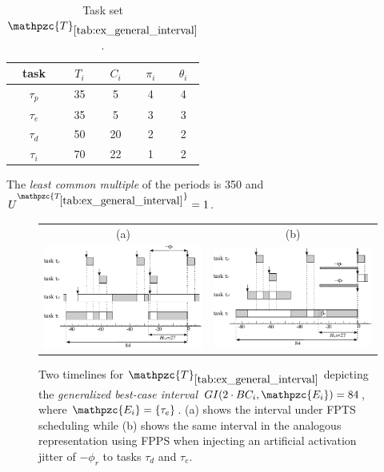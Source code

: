 \documentclass[fleqn]{article}
\begin{document}
\begin{table}
	\center
	\caption{Task set $\mathpzc{T}_{\ref{tab:ex_general_interval}}$.}
	\label{tab:ex_general_interval}
	\begin{tabular}{c c c c c}
		\hline 
		task & $T_i$ & $C_i$ & $\pi_i$ & $\theta_i$ \\ 
		\hline 
		$\tau_p$& 35 & 5  & 4 & 4 \\
		$\tau_e$& 35 & 5  & 3 & 3 \\ 
		$\tau_d$& 50 & 20 & 2 & 2 \\ 
		$\tau_i$& 70 & 22 & 1 & 2 \\
		\hline 
	\end{tabular}
	\small
	\item The \textit{least common multiple} of the periods is 350 and $U^{\mathpzc{T_{\ref{tab:ex_general_interval}}}}=1$.
\end{table}

\begin{figure}
	\centering
	\begin{tabular}{cc}
		(a) & (b) \\
	\includegraphics[width=0.5\linewidth]{figures/ex_general_interval1} &
	\includegraphics[width=0.5\linewidth]{figures/ex_general_interval2}
	\end{tabular}
	
	\caption{Two timelines for $\mathpzc{T}_{\ref{tab:ex_general_interval}}$ depicting the \textit{generalized best-case interval} $GI(2 \cdot BC_i,\mathpzc{E_i}) = 84$, where $\mathpzc{E_i} = \{\tau_e\}$. (a) shows the interval under FPTS scheduling while (b) shows the same interval in the analogous representation using FPPS when injecting an artificial activation jitter of $-\phi_r$ to tasks $\tau_d$ and $\tau_e$.}
	\label{fig:ex_general_interval1}
\end{figure}
\end{document}
